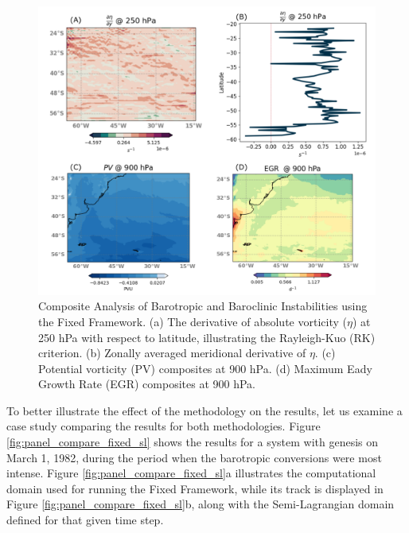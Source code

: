 \begin{figure}[!htbp]
    \centering
    \includegraphics[width=\textwidth]{figs_6/ibc_ibt_panel_fixed.pdf}
    \caption[Rayleigh Criterion and EGR - Fixed Framework]{Composite Analysis of Barotropic and Baroclinic Instabilities using the Fixed Framework. (a) The derivative of absolute vorticity ($\eta$) at 250 hPa with respect to latitude, illustrating the Rayleigh-Kuo (RK) criterion. (b) Zonally averaged meridional derivative of $\eta$. (c) Potential vorticity (PV) composites at 900 hPa. (d) Maximum Eady Growth Rate (EGR) composites at 900 hPa.}
    \label{fig:ibc_ibt_panel_fixed}
\end{figure}

To better illustrate the effect of the methodology on the results, let us examine a case study comparing the results for both methodologies. Figure \ref{fig:panel_compare_fixed_sl} shows the results for a system with genesis on March 1, 1982, during the period when the barotropic conversions were most intense. Figure \ref{fig:panel_compare_fixed_sl}a illustrates the computational domain used for running the Fixed Framework, while its track is displayed in Figure \ref{fig:panel_compare_fixed_sl}b, along with the Semi-Lagrangian domain defined for that given time step.

